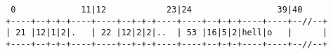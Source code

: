 \documentclass[varwidth,crop]{standalone}
\begin{document}
\begin{verbatim}
 0             11|12            23|24                 39|40
+----+--+-+-+----+----+--+-+-+----+----+--+-+-+----+----+--//--+
| 21 |12|1|2|.   | 22 |12|2|2|..  | 53 |16|5|2|hell|o   |      |
+----+--+-+-+----+----+--+-+-+----+----+--+-+-+----+----+--//--+
\end{verbatim}
\end{document}
